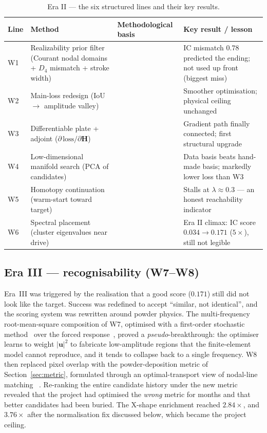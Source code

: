 \documentclass[11pt,a4paper]{article}
\newcommand{\Dfour}{D_4}
\newcommand{\matH}{\mathbf{H}}
\begin{document}
\begin{table}[h]
\centering
\caption{Era II --- the six structured lines and their key results.}
\label{tab:eraII}
\small
\begin{tabular}{@{}p{0.7cm}p{5.3cm}p{2.2cm}p{6.8cm}@{}}
\toprule
Line & Method & Methodological basis & Key result / lesson \\
\midrule
W1 & Realizability prior filter (Courant nodal domains + $\Dfour$ mismatch + stroke width) & \cite{courant1953,pleijel1956,waller1939} & IC mismatch $0.78$ predicted the ending; not used up front (biggest miss) \\
W2 & Main-loss redesign (IoU $\to$ amplitude valley) & \cite{nocedal2006} & Smoother optimisation; physical ceiling unchanged \\
W3 & Differentiable plate + adjoint ($\partial\,\text{loss}/\partial\matH$) & \cite{giles2000,baydin2018,paszke2019,fox1968,nelson1976} & Gradient path finally connected; first structural upgrade \\
W4 & Low-dimensional manifold search (PCA of candidates) & \cite{pearson1901,berkooz1993} & Data basis beats hand-made basis; markedly lower loss than W3 \\
W5 & Homotopy continuation (warm-start toward target) & \cite{allgower1990,blake1987} & Stalls at $\lambda\approx0.3$ --- an honest reachability indicator \\
W6 & Spectral placement (cluster eigenvalues near drive) & \cite{pedersen2000,achtziger2007} & Era II climax: IC score $0.034\to0.171$ ($5\times$), still not legible \\
\bottomrule
\end{tabular}
\end{table}

\subsection{Era III --- recognisability (W7--W8)}\label{sec:eraIII}
Era~III was triggered by the realisation that a good score ($0.171$) still did not
look like the target. Success was redefined to accept ``similar, not identical'',
and the scoring system was rewritten around powder physics. The multi-frequency
root-mean-square composition of W7, optimised with a first-order stochastic
method~\cite{kingma2015} over the forced response~\cite{leissa1969}, proved a
\emph{pseudo}-breakthrough: the optimiser learns to weight $|\bm{u}|^2$ to
fabricate low-amplitude regions that the finite-element model cannot reproduce,
and it tends to collapse back to a single frequency. W8 then replaced pixel
overlap with the powder-deposition metric of Section~\ref{sec:metric}, formulated
through an optimal-transport view of nodal-line matching~%
\cite{chladni1787,cuturi2013,engquist2014}. Re-ranking the entire candidate history under the new
metric revealed that the project had optimised the \emph{wrong} metric for months
and that better candidates had been buried. The X-shape enrichment reached
$2.84\times$, and $3.76\times$ after the normalisation fix discussed below, which
became the project ceiling.
\end{document}
